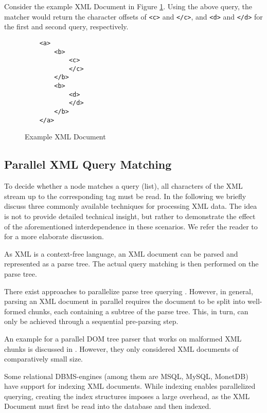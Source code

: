 Consider the example XML Document in Figure \ref{src:exampleXML}. Using the
above query, the matcher would return the character offsets of \verb;<c>; and
\verb;</c>;, and \verb;<d>; and \verb;</d>; for the first and second query,
respectively.

\lstset{
         numbers=left
 }

\begin{figure}[htb]
\begin{lstlisting}
    <a>
        <b>
            <c>
            </c>
        </b>
        <b>
            <d>
            </d>
        </b>
    </a>
\end{lstlisting}
\caption{Example XML Document}
\label{src:exampleXML}
\end{figure}


\subsection{Parallel XML Query Matching}
To decide whether a node matches a query (list), all characters of the XML stream
up to the corresponding tag must be read. In the following we briefly discuss
three commonly available techniques for processing XML data. The idea is not to
provide detailed technical insight, but rather to demonstrate the effect of the
aforementioned interdependence in these scenarios. We refer the reader to
\cite{Ogden2013} for a more elaborate discussion.

 As XML is a context-free language, an XML
document can be parsed and represented as a parse tree. The actual query
matching is then performed on the parse tree.

There exist approaches to parallelize parse tree querying \cite{You11}. However,
in general, parsing an XML document in parallel requires the document to be
split into well-formed chunks, each containing a subtree of the parse tree.
This, in turn, can only be achieved through a sequential pre-parsing step.

An example for a parallel DOM tree parser that works on malformed XML chunks is
discussed in \cite{Shah09}. However, they only considered XML documents of
comparatively small size.

 Some relational DBMS-engines (among them are MSQL,
MySQL, MonetDB) have support for indexing XML documents. While indexing enables
parallelized querying, creating the index structures imposes a large overhead,
as the XML Document must first be read into the database and then indexed.

